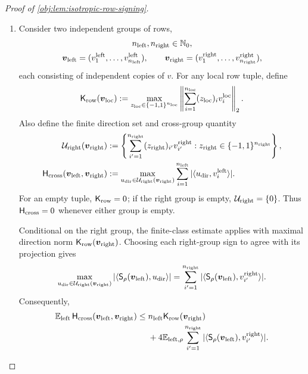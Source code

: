 \documentclass[11pt]{article}
\begin{document}
\begin{proof}[Proof of \cref{obj:lem:isotropic-row-signing}]
\begin{enumerate}
\item Consider two independent groups of rows,
\[
\begin{gathered}
n_{\rm left},n_{\rm right}\in\mathbb N_0,\\
\boldsymbol v_{\rm left}
=(v^{\rm left}_1,\ldots,v^{\rm left}_{n_{\rm left}}),
\qquad
\boldsymbol v_{\rm right}
=(v^{\rm right}_1,\ldots,v^{\rm right}_{n_{\rm right}}),
\end{gathered}
\]
each consisting of independent copies of \(v\). For any local row tuple, define
\[
\mathsf K_{\rm row}(\boldsymbol v_{\rm loc})
:=
\max_{z_{\rm loc}\in\{-1,1\}^{n_{\rm loc}}}
\left\|\sum_{i=1}^{n_{\rm loc}}
(z_{\rm loc})_i v_i^{\rm loc}\right\|_2.
\]
Also define the finite direction set and cross-group quantity
\[
\begin{aligned}
\mathcal U_{\rm right}(\boldsymbol v_{\rm right})
&:=
\left\{\sum_{i'=1}^{n_{\rm right}}
(z_{\rm right})_{i'}v_{i'}^{\rm right}:
z_{\rm right}\in\{-1,1\}^{n_{\rm right}}\right\},\\
\mathsf H_{\rm cross}(\boldsymbol v_{\rm left},\boldsymbol v_{\rm right})
&:=
\max_{u_{\rm dir}\in\mathcal U_{\rm right}(\boldsymbol v_{\rm right})}
\sum_{i=1}^{n_{\rm left}}
|\langle u_{\rm dir},v_i^{\rm left}\rangle|.
\end{aligned}
\]
For an empty tuple, \(\mathsf K_{\rm row}=0\); if the right group is empty, \(\mathcal U_{\rm right}=\{0\}\). Thus \(\mathsf H_{\rm cross}=0\) whenever either group is empty.

Conditional on the right group, the finite-class estimate applies with maximal direction norm \(\mathsf K_{\rm row}(\boldsymbol v_{\rm right})\). Choosing each right-group sign to agree with its projection gives
\[
\max_{u_{\rm dir}\in\mathcal U_{\rm right}(\boldsymbol v_{\rm right})}
|\langle\mathsf S_\rho(\boldsymbol v_{\rm left}),u_{\rm dir}\rangle|
=
\sum_{i'=1}^{n_{\rm right}}
|\langle\mathsf S_\rho(\boldsymbol v_{\rm left}),v_{i'}^{\rm right}\rangle|.
\]
Consequently,
\[
\begin{aligned}
\mathbb E_{\rm left}\,
\mathsf H_{\rm cross}(\boldsymbol v_{\rm left},\boldsymbol v_{\rm right})
\leq{}&
n_{\rm left}\mathsf K_{\rm row}(\boldsymbol v_{\rm right})\\
&+4\mathbb E_{{\rm left},\rho}
\sum_{i'=1}^{n_{\rm right}}
|\langle\mathsf S_\rho(\boldsymbol v_{\rm left}),v_{i'}^{\rm right}\rangle|.
\end{aligned}
\]


\end{enumerate}
\end{proof}
\end{document}
